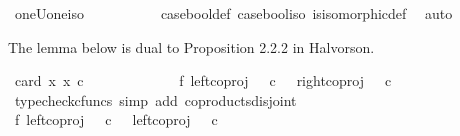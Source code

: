 \begin{isabellebody}
\isamarkupfalse%
%
\endisatagproof
{\isafoldproof}%
%
\isadelimproof
\isanewline
%
\endisadelimproof
\isanewline
{}\isamarkupfalse%
\ oneUone{\isacharunderscore}{\kern0pt}iso{\isacharunderscore}{\kern0pt}{\isasymOmega}{\isacharcolon}{\kern0pt}\isanewline
\ \ {\isachardoublequoteopen}{\isasymOmega}\ {\isasymcong}\ {\isasymone}\ {\isasymCoprod}\ {\isasymone}{\isachardoublequoteclose}\isanewline
%
\isadelimproof
\ \ %
\endisadelimproof
%
\isatagproof
{}\isamarkupfalse%
\ case{\isacharunderscore}{\kern0pt}bool{\isacharunderscore}{\kern0pt}def{}\ case{\isacharunderscore}{\kern0pt}bool{\isacharunderscore}{\kern0pt}iso\ is{\isacharunderscore}{\kern0pt}isomorphic{\isacharunderscore}{\kern0pt}def\ \isamarkupfalse%
\ auto%
\endisatagproof
{\isafoldproof}%
%
\isadelimproof
%
\endisadelimproof
%
\begin{isamarkuptext}%
The lemma below is dual to Proposition 2.2.2 in Halvorson.%
\end{isamarkuptext}\isamarkuptrue%
\isamarkupfalse%
\ {\isachardoublequoteopen}card\ {\isacharbraceleft}{\kern0pt}x{\isachardot}{\kern0pt}\ x\ {\isasymin}\isactrlsub c\ {\isasymOmega}\ {\isasymCoprod}\ {\isasymOmega}{\isacharbraceright}{\kern0pt}\ {\isacharequal}{\kern0pt}\ {}{\isachardoublequoteclose}\isanewline
%
\isadelimproof
%
\endisadelimproof
%
\isatagproof
{}\isamarkupfalse%
\ {\isacharminus}{\kern0pt}\isanewline
\ \ \isanewline
\ \ \isamarkupfalse%
\ f{}{\isacharcolon}{\kern0pt}\ {\isachardoublequoteopen}{\isacharparenleft}{\kern0pt}left{\isacharunderscore}{\kern0pt}coproj\ {\isasymOmega}\ {\isasymOmega}{\isacharparenright}{\kern0pt}\ {\isasymcirc}\isactrlsub c\ {\isasymt}\ {\isasymnoteq}\ {\isacharparenleft}{\kern0pt}right{\isacharunderscore}{\kern0pt}coproj\ {\isasymOmega}\ {\isasymOmega}{\isacharparenright}{\kern0pt}\ {\isasymcirc}\isactrlsub c\ {\isasymt}{\isachardoublequoteclose}\isanewline
\ \ \ \ \isamarkupfalse%
\ {\isacharparenleft}{\kern0pt}typecheck{\isacharunderscore}{\kern0pt}cfuncs{\isacharcomma}{\kern0pt}\ simp\ add{\isacharcolon}{\kern0pt}\ coproducts{\isacharunderscore}{\kern0pt}disjoint{\isacharparenright}{\kern0pt}\isanewline
\ \ \isamarkupfalse%
\ f{}{\isacharcolon}{\kern0pt}\ {\isachardoublequoteopen}{\isacharparenleft}{\kern0pt}left{\isacharunderscore}{\kern0pt}coproj\ {\isasymOmega}\ {\isasymOmega}{\isacharparenright}{\kern0pt}\ {\isasymcirc}\isactrlsub c\ {\isasymt}\ {\isasymnoteq}\ {\isacharparenleft}{\kern0pt}left{\isacharunderscore}{\kern0pt}coproj\ {\isasymOmega}\ {\isasymOmega}{\isacharparenright}{\kern0pt}\ {\isasymcirc}\isactrlsub c\ {\isasymf}{\isachardoublequoteclose}\isanewline

\end{isabellebody}
